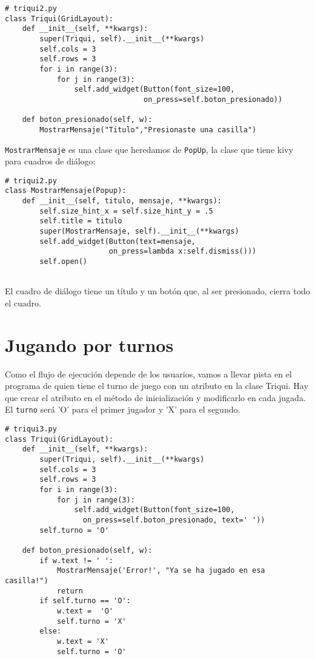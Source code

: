 \beforeverb
\begin{verbatim}
# triqui2.py
class Triqui(GridLayout):
    def __init__(self, **kwargs):
        super(Triqui, self).__init__(**kwargs)
        self.cols = 3
        self.rows = 3
        for i in range(3):
            for j in range(3):
                self.add_widget(Button(font_size=100, 
                                on_press=self.boton_presionado))
        
    def boton_presionado(self, w):
        MostrarMensaje("Titulo","Presionaste una casilla")

\end{verbatim}
\afterverb

\texttt{MostrarMensaje} es una clase que heredamos de \texttt{PopUp}, la clase que tiene kivy para
cuadros de diálogo:

\beforeverb
\begin{verbatim}
# triqui2.py
class MostrarMensaje(Popup): 
    def __init__(self, titulo, mensaje, **kwargs):
        self.size_hint_x = self.size_hint_y = .5
        self.title = titulo
        super(MostrarMensaje, self).__init__(**kwargs)
        self.add_widget(Button(text=mensaje, 
                        on_press=lambda x:self.dismiss()))
        self.open()


\end{verbatim}
\afterverb

El cuadro de diálogo tiene un título y un botón que, al ser presionado, cierra
todo el cuadro.

\section{Jugando por turnos}

Como el flujo de ejecución depende de los usuarios, vamos a llevar pista en el 
programa de quien tiene el turno de juego con un atributo en la clase Triqui.
Hay que crear el atributo en el método de inicialización y modificarlo en 
cada jugada. El \texttt{turno} será 'O' para el primer jugador y 'X' para el segundo.

\beforeverb
\begin{verbatim}
# triqui3.py
class Triqui(GridLayout):
    def __init__(self, **kwargs):
        super(Triqui, self).__init__(**kwargs)
        self.cols = 3
        self.rows = 3
        for i in range(3):
            for j in range(3):
                self.add_widget(Button(font_size=100, 
                  on_press=self.boton_presionado, text=' '))
        self.turno = 'O'

    def boton_presionado(self, w):
        if w.text != ' ':
            MostrarMensaje('Error!', "Ya se ha jugado en esa casilla!")
            return
        if self.turno == 'O':
            w.text =  'O'
            self.turno = 'X'
        else:
            w.text = 'X'
            self.turno = 'O'
\end{verbatim}
\afterverb

